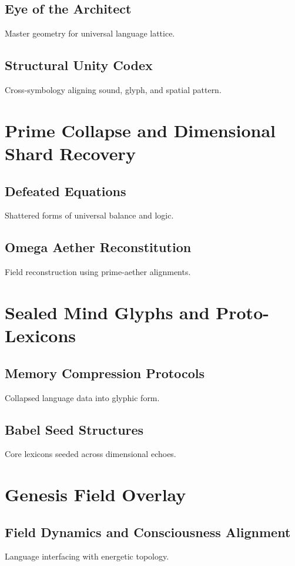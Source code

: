 \documentclass[12pt]{article}
\begin{document}
\subsection{Eye of the Architect}
Master geometry for universal language lattice.

\subsection{Structural Unity Codex}
Cross-symbology aligning sound, glyph, and spatial pattern.

\section{Prime Collapse and Dimensional Shard Recovery}
\subsection{Defeated Equations}
Shattered forms of universal balance and logic.

\subsection{Omega Aether Reconstitution}
Field reconstruction using prime-aether alignments.

\section{Sealed Mind Glyphs and Proto-Lexicons}
\subsection{Memory Compression Protocols}
Collapsed language data into glyphic form.

\subsection{Babel Seed Structures}
Core lexicons seeded across dimensional echoes.

\section{Genesis Field Overlay}
\subsection{Field Dynamics and Consciousness Alignment}
Language interfacing with energetic topology.
\end{document}
